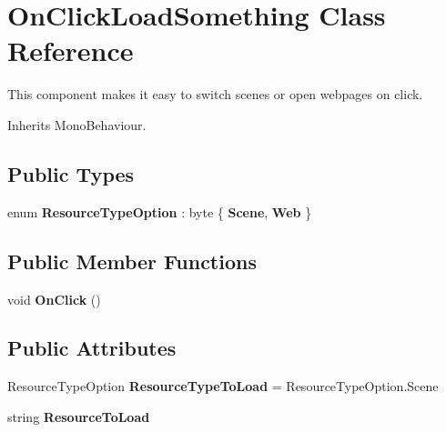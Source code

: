 \hypertarget{class_on_click_load_something}{}\section{On\+Click\+Load\+Something Class Reference}
\label{class_on_click_load_something}


This component makes it easy to switch scenes or open webpages on click.  




Inherits Mono\+Behaviour.

\subsection*{Public Types}
\begin{DoxyCompactItemize}
\item 
enum {\bfseries Resource\+Type\+Option} \+: byte \{ {\bfseries Scene}, 
{\bfseries Web}
 \}\hypertarget{class_on_click_load_something_a43b622b02426c42ad0c1f841dcaef1ba}{}\label{class_on_click_load_something_a43b622b02426c42ad0c1f841dcaef1ba}

\end{DoxyCompactItemize}
\subsection*{Public Member Functions}
\begin{DoxyCompactItemize}
\item 
void {\bfseries On\+Click} ()\hypertarget{class_on_click_load_something_af1512a2aa80938655fd4f50b93f401b6}{}\label{class_on_click_load_something_af1512a2aa80938655fd4f50b93f401b6}

\end{DoxyCompactItemize}
\subsection*{Public Attributes}
\begin{DoxyCompactItemize}
\item 
Resource\+Type\+Option {\bfseries Resource\+Type\+To\+Load} = Resource\+Type\+Option.\+Scene\hypertarget{class_on_click_load_something_ac8ae07ff76e4759f49d73d931a46ad11}{}\label{class_on_click_load_something_ac8ae07ff76e4759f49d73d931a46ad11}

\item 
string {\bfseries Resource\+To\+Load}\hypertarget{class_on_click_load_something_ae51a4e24aa18f52c1c36df756c2aaab7}{}\label{class_on_click_load_something_ae51a4e24aa18f52c1c36df756c2aaab7}

\end{DoxyCompactItemize}


